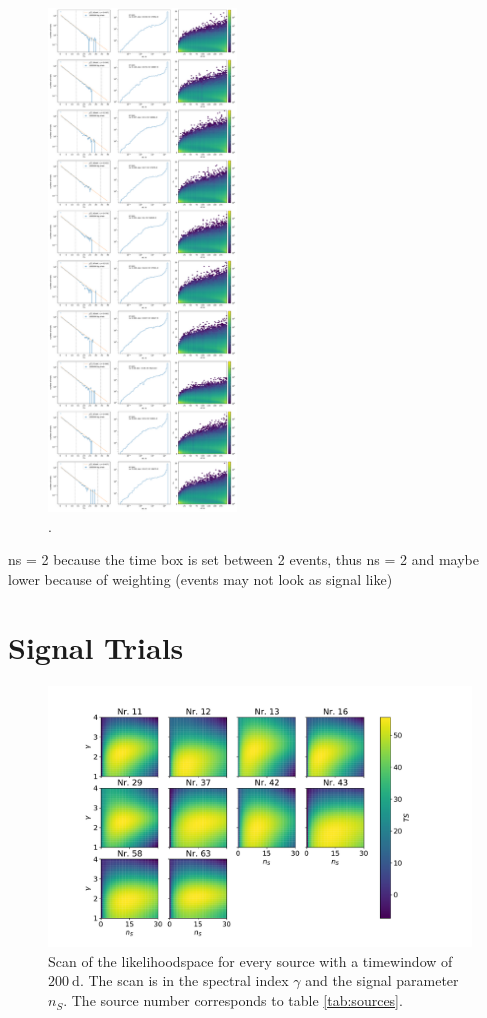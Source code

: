 \begin{figure}
    \centering
    \includegraphics[width=5cm]{Plots/05_csky/9_years_gfu_gold_time_dep_bg_timewindows_fixed_t0.pdf}
    \caption{.}
\end{figure}

ns = 2 because the time box is set between 2 events, thus ns = 2 and maybe lower because of weighting (events may not look as signal like)
\section{Signal Trials}

\begin{figure}
    \centering
    \includegraphics[width=\linewidth]{Plots/05_csky/llh_scan.pdf}
    \caption{Scan of the likelihoodspace for every source with a timewindow of $\SI{200}{\day}$. The scan is in the spectral index $\gamma$ and the signal parameter $n_S$. The source number corresponds to table \ref{tab:sources}.}
    \label{fig:llh_scan_time_dep}
\end{figure}
